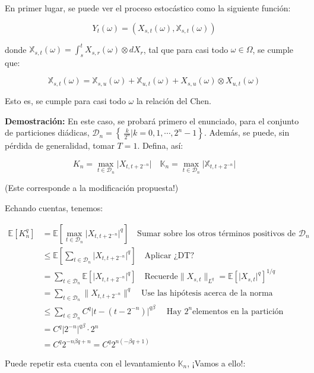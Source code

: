 En primer lugar, se puede ver el proceso estocástico como la siguiente función:

\[
	Y_t (\omega) = (X_{s,t} (\omega), \mathbb{X}_{s,t} (\omega) )
\]

donde $\mathbb{X}_{s,t} (\omega) = \int_s^t X_{s,r} (\omega) \otimes dX_{r}$, tal que para casi todo $\omega \in \Omega$, se cumple que:

\[
	\mathbb{X}_{s,t} (\omega) = \mathbb{X}_{s,u} (\omega) + \mathbb{X}_{u,t} (\omega) + X_{s,u} (\omega) \otimes X_{u,t} (\omega)
\]

Esto es, se cumple para casi todo $\omega$ la relación del Chen.

\textbf{Demostración:} En este caso, se probará primero el enunciado, para el conjunto de particiones diádicas, $\mathcal{D}_n = \left\{\ \frac{k}{2^n} \vert k = 0, 1, \cdots, 2^n - 1 \right\}$. Además, se puede, sin pérdida de generalidad, tomar $T = 1$. Defina, así:

\[
	K_n = \max_{t \in \mathcal{D}_n} \lvert X_{t, t + 2^{-n}} \rvert \quad \mathbb{K}_n = \max_{t \in \mathcal{D}_n} \lvert \mathbb{X}_{t, t + 2^{-n}} \rvert
\]

(Este corresponde a la modificación propuesta!)

Echando cuentas, tenemos:

\begin{align*}
	\mathbb{E}[K^q_n] &= \mathbb{E}\left[  \max_{t \in \mathcal{D}_n} \lvert X_{t, t + 2^{-n}} \rvert^q \right] \quad \text{Sumar sobre los otros términos positivos de } \mathcal{D}_n \\
	&\leq \mathbb{E} \left[ \sum_{t \in \mathcal{D}_n} \lvert X_{t, t + 2^{-n}} \rvert^q \right] \quad \text{Aplicar ¿DT?} \\
	&= \sum_{t \in \mathcal{D}_n} \mathbb{E} [ \lvert X_{t, t + 2^{-n}} \rvert^q ] \quad \text{Recuerde} \lVert X_{s,t} \rVert_{L^q} = \mathbb{E}[ \lvert X_{s,t} \rvert^q ]^{1/q} \\
	&= \sum_{t \in \mathcal{D}_n} \lVert X_{t,t+ 2^{-n}} \rVert^q \quad \text{Use las hipótesis acerca de la norma}  \\
	&\leq \sum_{t \in \mathcal{D}_n} C^q \lvert t - (t - 2^{-n}) \rvert^{q \beta} \quad \text{ Hay } 2^n \text{elementos en la partición} \\
	&= C^q \lvert 2^{-n} \rvert^{q \beta} \cdot 2^n \\
	&= C^q 2^{-n \beta q + n} = C^q 2^{n (- \beta q + 1)}
\end{align*}

Puede repetir esta cuenta con el levantamiento $\mathbb{K}_n$, ¡Vamos a ello!: 

